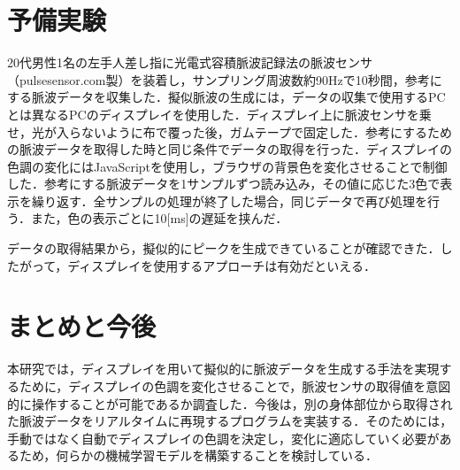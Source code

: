 \documentclass[Japanese,noauthor]{dicomopapers}
\begin{document}
\section{予備実験}
20代男性1名の左手人差し指に光電式容積脈波記録法の脈波センサ（pulsesensor.com製）を装着し，サンプリング周波数約90Hzで10秒間，参考にする脈波データを収集した．擬似脈波の生成には，データの収集で使用するPCとは異なるPCのディスプレイを使用した．ディスプレイ上に脈波センサを乗せ，光が入らないように布で覆った後，ガムテープで固定した．参考にするための脈波データを取得した時と同じ条件でデータの取得を行った．ディスプレイの色調の変化にはJavaScriptを使用し，ブラウザの背景色を変化させることで制御した．参考にする脈波データを1サンプルずつ読み込み，その値に応じた3色で表示を繰り返す．全サンプルの処理が終了した場合，同じデータで再び処理を行う．また，色の表示ごとに10[ms]の遅延を挟んだ．
\par

データの取得結果から，擬似的にピークを生成できていることが確認できた．したがって，ディスプレイを使用するアプローチは有効だといえる．


\section{まとめと今後}
本研究では，ディスプレイを用いて擬似的に脈波データを生成する手法を実現するために，ディスプレイの色調を変化させることで，脈波センサの取得値を意図的に操作することが可能であるか調査した．今後は，別の身体部位から取得された脈波データをリアルタイムに再現するプログラムを実装する．そのためには，手動ではなく自動でディスプレイの色調を決定し，変化に適応していく必要があるため，何らかの機械学習モデルを構築することを検討している．




\end{document}
